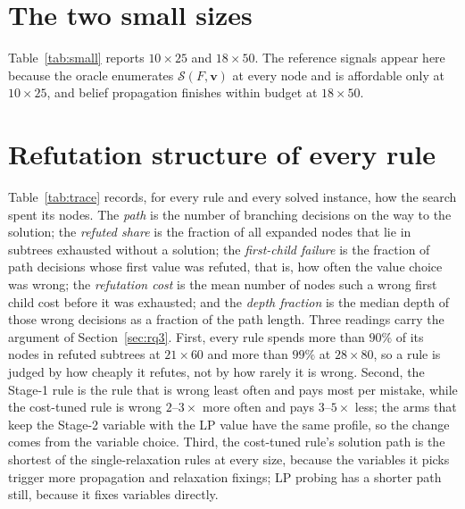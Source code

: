\documentclass[final,5p,times,twocolumn,authoryear]{elsarticle}
\newcommand{\SOL}{\mathcal{S}}
\begin{document}
\appendix
\section{The two small sizes}
\label{app:small}

Table~\ref{tab:small} reports $10\times25$ and $18\times50$. The reference signals appear here because the oracle enumerates $\SOL(F,\mathbf{v})$ at every node and is affordable only at $10\times25$, and belief propagation finishes within budget at $18\times50$.

\section{Refutation structure of every rule}
\label{app:trace}

Table~\ref{tab:trace} records, for every rule and every solved instance, how the search spent its nodes. The \emph{path} is the number of branching decisions on the way to the solution; the \emph{refuted share} is the fraction of all expanded nodes that lie in subtrees exhausted without a solution; the \emph{first-child failure} is the fraction of path decisions whose first value was refuted, that is, how often the value choice was wrong; the \emph{refutation cost} is the mean number of nodes such a wrong first child cost before it was exhausted; and the \emph{depth fraction} is the median depth of those wrong decisions as a fraction of the path length. Three readings carry the argument of Section~\ref{sec:rq3}. First, every rule spends more than $90\%$ of its nodes in refuted subtrees at $21\times60$ and more than $99\%$ at $28\times80$, so a rule is judged by how cheaply it refutes, not by how rarely it is wrong. Second, the Stage-1 rule is the rule that is wrong least often and pays most per mistake, while the cost-tuned rule is wrong $2$--$3\times$ more often and pays $3$--$5\times$ less; the arms that keep the Stage-2 variable with the LP value have the same profile, so the change comes from the variable choice. Third, the cost-tuned rule's solution path is the shortest of the single-relaxation rules at every size, because the variables it picks trigger more propagation and relaxation fixings; LP probing has a shorter path still, because it fixes variables directly.
\end{document}
